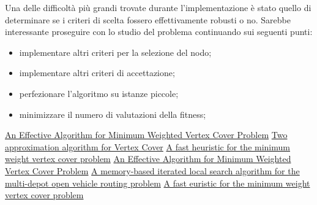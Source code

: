 \documentclass[11pt]{article}
\begin{document}
\begin{table}[!ht]
\begin{tabular}{|l|l|l|l|}
    \end{tabular}
\end{table}

\pagebreak

Una delle difficoltà più grandi trovate durante l'implementazione è stato quello di determinare se i criteri di scelta fossero effettivamente robusti o no. Sarebbe interessante proseguire con lo studio del problema continuando sui seguenti punti:

\begin{itemize}
    \item{implementare altri criteri per la selezione del nodo;}
    \item{implementare altri criteri di accettazione;}
    \item{perfezionare l'algoritmo su istanze piccole;}
    \item{minimizzare il numero di valutazioni della fitness;}
\end{itemize}

\pagebreak

\begin{thebibliography}{6}

 \href{https://www.researchgate.net/publication/242463011_An_Effective_Algorithm_for_Minimum_Weighted_Vertex_Cover_problem}{An Effective Algorithm for Minimum Weighted Vertex Cover Problem}
 \href{https://www.cs.umd.edu/class/fall2018/cmsc858E/pdfs/651/vc.pdf} {Two approximation algorithm for Vertex Cover} 
 \href{https://ieeexplore.ieee.org/abstract/document/7550782}{A fast heuristic for the minimum weight vertex cover problem}
 \href{https://www.researchgate.net/publication/242463011_An_Effective_Algorithm_for_Minimum_Weighted_Vertex_Cover_problem}{An Effective Algorithm for Minimum Weighted Vertex Cover Problem}
 \href{https://www.sciencedirect.com/science/article/abs/pii/S0377221720300278}{A memory-based iterated local search algorithm for the multi-depot open vehicle routing problem}
 \href{https://ieeexplore.ieee.org/document/7550782}{A fast euristic for the minimum weight vertex cover problem}

\end{thebibliography}


\pagebreak
\end{document}
